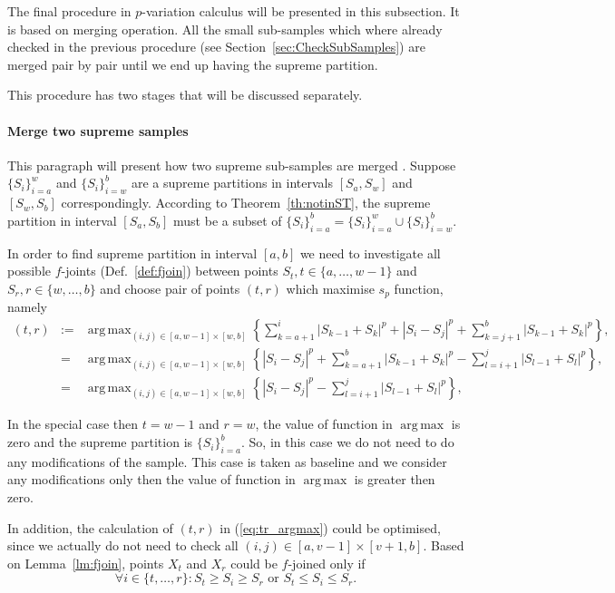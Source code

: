 \documentclass[12pt, a4paper]{article}
\DeclareMathOperator*{\argmax}{arg\,max}
\numberwithin{equation}{section}
\begin{document}
The final procedure in $p$-variation calculus will be
presented in this subsection. It is based on
merging operation. 
All the small sub-samples which where 
already checked in the 
previous procedure 
(see Section~\ref{sec:CheckSubSamples}) 
are merged pair by pair until  we end up having
the supreme partition.

This procedure has two stages that will be discussed separately.

\paragraph{Merge two supreme samples}

This paragraph will present how two supreme
sub-samples are merged .
Suppose $\{S_{i}\}_{i=a}^{w}$  and $\{S_{i}\}_{i=w}^{b}$
are a supreme partitions in intervals $[S_a,S_w]$ and $[S_w,S_b]$ correspondingly. 
According to Theorem~\ref{th:notinST},
the supreme partition in interval $[S_a, S_b]$ 
must be a subset of 
$\{S_{i}\}_{i=a}^{b} = \{S_{i}\}_{i=a}^{w} \cup \{S_{i}\}_{i=w}^{b}$.
 
In order to find supreme partition in interval $[a,b]$
we need to investigate all possible
$f$-joints (Def.~\ref{def:fjoin}) between points $S_t, t\in \{a,\dots,w-1\}$ and
$S_r, r\in \{w,\dots,b\}$ and choose pair of points
$(t, r)$ which maximise $s_p$ function, namely  
\begin{eqnarray}
  (t, r) &:=& \argmax_{(i,j) \in [a, w-1] \times [w, b] } 
    \left\{ \sum_{k=a+1}^i |S_{k-1} + S_{k}|^p + |S_i-S_j|^p 
    + \sum_{k=j+1}^b |S_{k-1} + S_{k}|^p \right\}, \nonumber \\
  &=& \argmax_{(i,j) \in [a, w-1] \times [w, b] }  
    \left\{|S_i-S_j|^p +  \sum_{k=a+1}^b |S_{k-1} + S_{k}|^p  
    - \sum_{l=i+1}^j |S_{l-1} + S_{l}|^p  \right\}, \nonumber \\
   \label{eq:tr_argmax}  
   &=& \argmax_{(i,j) \in [a, w-1] \times [w, b] }  
    \left\{|S_i-S_j|^p - \sum_{l=i+1}^j |S_{l-1} + S_{l}|^p  \right\},   
\end{eqnarray}

In the special case then $t=w-1$ and $r=w$, the value 
of function in $\argmax$ is zero and the supreme
partition is $\{S_{i}\}_{i=a}^{b}$. 
So, in this case we do not 
need to do any modifications of the sample. 
This case is taken as baseline and we consider 
any modifications only then the value of function
in $\argmax$ is greater then zero.

In addition, the calculation of $(t, r)$ in (\ref{eq:tr_argmax})
could be optimised, since we actually do not need to check
all $(i,j) \in [a, v-1] \times [v+1, b]$. 
Based on Lemma~\ref{lm:fjoin},
points $X_t$ and $X_r$ could be $f$-joined only if 
\begin{equation}
  \forall i \in \{t,\dots,r\}: S_t \geq S_i \geq S_r \text{ or } 
  S_t \leq S_i \leq S_r.
\end{equation} 
   
\end{document}
